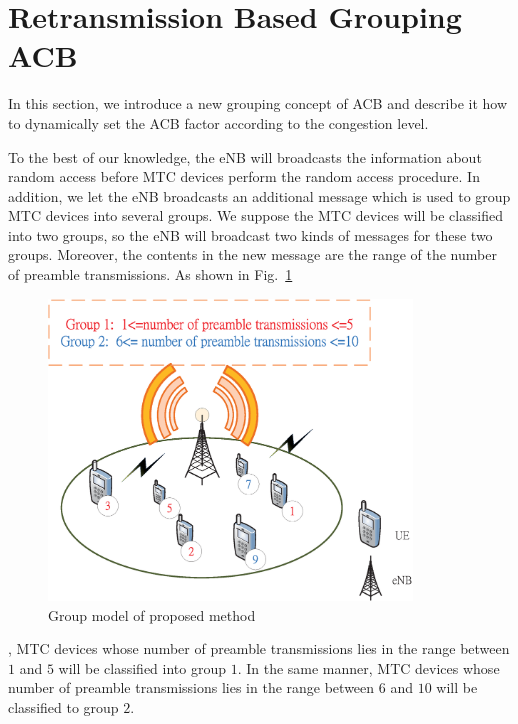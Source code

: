 \section{Retransmission Based Grouping ACB}
    \label{proposed}
    In this section, we introduce a new grouping concept of ACB and describe it how to dynamically set the ACB factor according to the congestion level.


    To the best of our knowledge, the eNB will broadcasts the information about random access before MTC devices perform the random access procedure. In addition, we let the eNB broadcasts an additional message which is used to group MTC devices into several groups.  We suppose the MTC devices will be classified into two groups, so the eNB will broadcast two kinds of messages for these two groups. Moreover, the contents in the new message are the range of the number of preamble transmissions. As shown in Fig.~\ref{fig_broadcast_groups}
    \begin{figure}[t]
    \centering
    \includegraphics[width=3.8in]{fig_broadcast_groups.eps}
    \caption{Group model of proposed method}
    \label{fig_broadcast_groups}
    \end{figure}
    , MTC devices whose number of preamble transmissions lies in the range between $1$ and $5$ will be classified into group $1$. In the same manner, MTC devices whose number of preamble transmissions lies in the range between $6$ and $10$ will be classified to group $2$.

